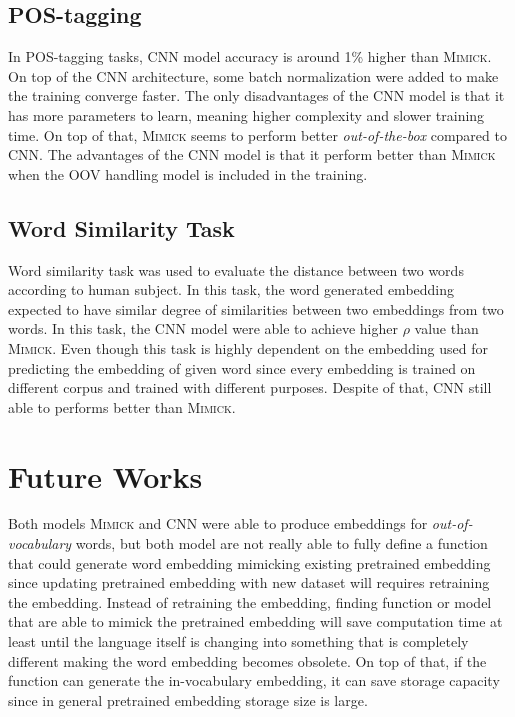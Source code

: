 \subsection{POS-tagging}
In POS-tagging tasks, CNN model accuracy is around 1\% higher than
\textsc{Mimick}. On top of the CNN architecture, some batch
normalization were added to make the training converge faster. The
only disadvantages of the CNN model is that it has more parameters to
learn, meaning higher complexity and slower training time. On top of
that, \textsc{Mimick} seems to perform better \textit{out-of-the-box}
compared to CNN. The advantages of the CNN model is that it perform
better than \textsc{Mimick} when the OOV handling model is included in
the training.

\subsection{Word Similarity Task}
Word similarity task was used to evaluate the distance between two
words according to human subject. In this task, the word generated
embedding expected to have similar degree of similarities between two
embeddings from two words. In this task, the CNN model were able to
achieve higher $\rho$ value than \textsc{Mimick}. Even though this
task is highly dependent on the embedding used for predicting the
embedding of given word since every embedding is trained on different
corpus and trained with different purposes. Despite of that, CNN still
able to performs better than \textsc{Mimick}.

\section{Future Works}
Both models \textsc{Mimick} and CNN were able to produce embeddings
for \textit{out-of-vocabulary} words, but both model are not really
able to fully define a function that could generate word embedding
mimicking existing pretrained embedding since updating pretrained
embedding with new dataset will requires retraining the embedding.
Instead of retraining the embedding, finding function or model that
are able to mimick the pretrained embedding will save computation time
at least until the language itself is changing into something that is
completely different making the word embedding becomes obsolete. On
top of that, if the function can generate the in-vocabulary embedding,
it can save storage capacity since in general pretrained embedding
storage size is large.